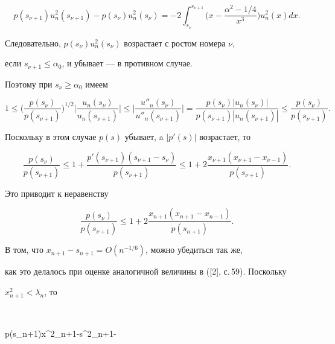 $$


p(s_{\nu+1})u_n^2(s_{\nu+1})-p(s_\nu)u_n^2(s_\nu)=


-2\int^{s_{\nu+1}}_{s_\nu}\bigg(x-\frac{\alpha^2-1/4}{x^3}\bigg)


{u^2_n(x)}dx.


$$


Следовательно, $p(s_\nu)u_n^2(s_\nu)$ возрастает с ростом номера $\nu$, 


если $s_{\nu+1}\leq\alpha_0$, и убывает --- в противном случае. 


Поэтому при $s_\nu\geq\alpha_0$ имеем


\begin{equation}


1\leq\bigg(\frac{p(s_\nu)}{p(s_{\nu+1})}\bigg)^{1/2}


\bigg|\frac{u_n(s_\nu)}{u_n(s_{\nu+1})}\bigg|\leq


\bigg|\frac{u''_n(s_\nu)}


{u''_n(s_{\nu+1})}\bigg|=


\frac{p(s_\nu)| u_n(s_\nu)|}


{p(s_{\nu+1})| u_n(s_{\nu+1})|}\leq\frac{p(s_\nu)}{p(s_{\nu+1})}.


\end{equation}


Поскольку в этом случае $p(s)$ убывает, a $|p'(s)|$ возрастает, то


$$


\frac{p(s_\nu)}{p(s_{\nu+1})}\leq


1+\frac{p'(s_{\nu+1})(s_{\nu+1}-s_\nu)}{p(s_{\nu+1})}\leq


1+2\frac{x_{\nu+1}(x_{\nu+1}-x_{\nu-1})}{p(s_{\nu+1})}.


$$


Это приводит к неравенству


$$


\frac{p(s_\nu)}{p(s_{\nu+1})}\leq


1+2\frac{x_{n+1}(x_{n+1}-x_{n-1})}{p(s_{n+1})}.


$$


В том, что $x_{n+1}-s_{n+1}=O(n^{-1/6})$, можно убедиться так же,


как это делалось при оценке аналогичной величины в ([2], с.\,59). Поскольку


$x^2_{n+1}<\lambda_n$, то 


$$


p(s_{n+1})\geq x^2_{n+1}-s^2_{n+1}-




